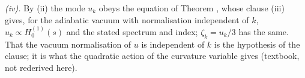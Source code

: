 \emph{(iv).} By (ii) the mode $u_{k}$ obeys the equation of Theorem , whose clause (iii) gives, for the adiabatic vacuum with normalisation independent of $k$, $u_{k} \propto H^{(1)}_{0}(s)$ and the stated spectrum and index; $\zeta_{k} = u_{k}/3$ has the same. That the vacuum normalisation of $u$ is independent of $k$ is the hypothesis of the clause; it is what the quadratic action of the curvature variable gives (textbook, not rederived here).
